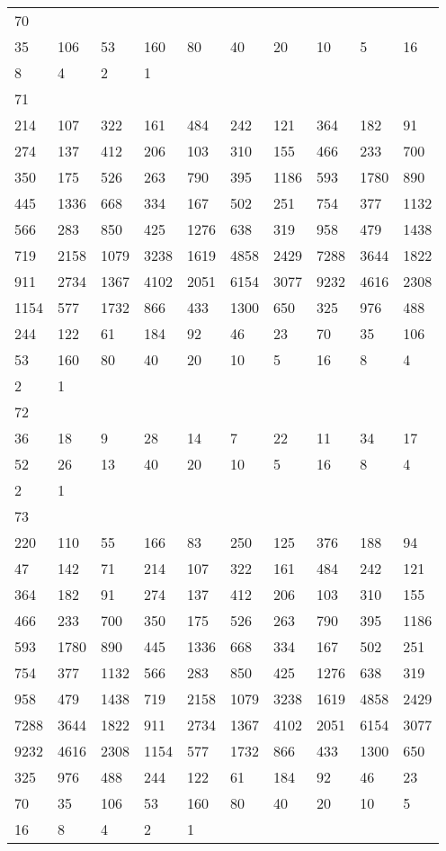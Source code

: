 \begin{longtable}{*{10}{l}}
70&&&&&&&&&\\
35& 106& 53& 160& 80& 40& 20& 10& 5& 16\\
8& 4& 2& 1& \\

71&&&&&&&&&\\
214& 107& 322& 161& 484& 242& 121& 364& 182& 91\\
274& 137& 412& 206& 103& 310& 155& 466& 233& 700\\
350& 175& 526& 263& 790& 395& 1186& 593& 1780& 890\\
445& 1336& 668& 334& 167& 502& 251& 754& 377& 1132\\
566& 283& 850& 425& 1276& 638& 319& 958& 479& 1438\\
719& 2158& 1079& 3238& 1619& 4858& 2429& 7288& 3644& 1822\\
911& 2734& 1367& 4102& 2051& 6154& 3077& 9232& 4616& 2308\\
1154& 577& 1732& 866& 433& 1300& 650& 325& 976& 488\\
244& 122& 61& 184& 92& 46& 23& 70& 35& 106\\
53& 160& 80& 40& 20& 10& 5& 16& 8& 4\\
2& 1& \\

72&&&&&&&&&\\
36& 18& 9& 28& 14& 7& 22& 11& 34& 17\\
52& 26& 13& 40& 20& 10& 5& 16& 8& 4\\
2& 1& \\

73&&&&&&&&&\\
220& 110& 55& 166& 83& 250& 125& 376& 188& 94\\
47& 142& 71& 214& 107& 322& 161& 484& 242& 121\\
364& 182& 91& 274& 137& 412& 206& 103& 310& 155\\
466& 233& 700& 350& 175& 526& 263& 790& 395& 1186\\
593& 1780& 890& 445& 1336& 668& 334& 167& 502& 251\\
754& 377& 1132& 566& 283& 850& 425& 1276& 638& 319\\
958& 479& 1438& 719& 2158& 1079& 3238& 1619& 4858& 2429\\
7288& 3644& 1822& 911& 2734& 1367& 4102& 2051& 6154& 3077\\
9232& 4616& 2308& 1154& 577& 1732& 866& 433& 1300& 650\\
325& 976& 488& 244& 122& 61& 184& 92& 46& 23\\
70& 35& 106& 53& 160& 80& 40& 20& 10& 5\\
16& 8& 4& 2& 1& \\


\end{longtable}
